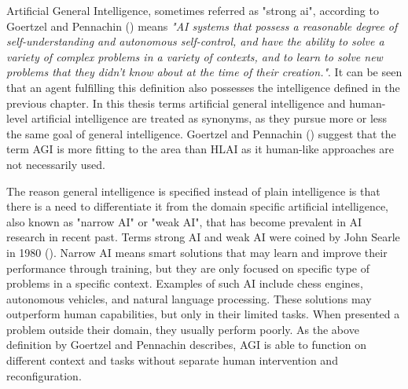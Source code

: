 \documentclass[utf8,english]{gradu3}
\begin{document}


Artificial General Intelligence, sometimes referred as "strong ai", according to
Goertzel and Pennachin (\cite*{goertzel2007}) means \emph{"AI systems that
possess a reasonable degree of self-understanding and autonomous self-control,
and have the ability to solve a variety of complex problems in a variety of
contexts, and to learn to solve new problems that they didn't know about at the
time of their creation."}. It can be seen that an agent fulfilling this
definition also possesses the intelligence defined in the previous chapter. In
this thesis terms artificial general intelligence and human-level artificial
intelligence are treated as synonyms, as they pursue more or less the same goal
of general intelligence. Goertzel and Pennachin (\cite*{goertzel2007}) suggest
that the term AGI is more fitting to the area than HLAI as it human-like
approaches are not necessarily used. 

The reason general intelligence is specified instead of plain intelligence is
that there is a need to differentiate it from the domain specific artificial
intelligence, also known as "narrow AI" or "weak AI", that has become prevalent
in AI research in recent past. Terms strong AI and weak AI were coined by John
Searle in 1980 (\cite{searle1980}). Narrow AI means smart solutions that may
learn and improve their performance through training, but they are only focused
on specific type of problems in a specific context. Examples of such AI include
chess engines, autonomous vehicles, and natural language processing. These
solutions may outperform human capabilities, but only in their limited tasks.
When presented a problem outside their domain, they usually perform poorly. As
the above definition by Goertzel and Pennachin describes, AGI is able to
function on different context and tasks without separate human intervention and
reconfiguration.
\end{document}
